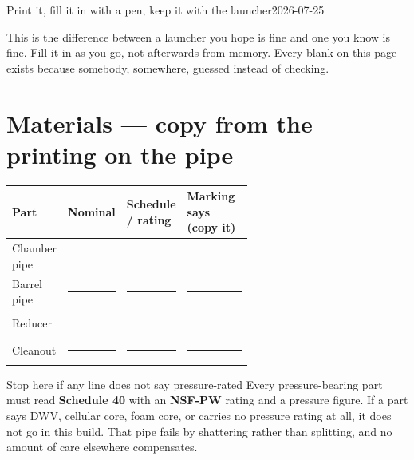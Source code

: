 


  {Print it, fill it in with a pen, keep it with the launcher}{2026-07-25}



This is the difference between a launcher you hope is fine and one you know is
fine. Fill it in as you go, not afterwards from memory. Every blank on this page
exists because somebody, somewhere, guessed instead of checking.

\begin{telosfacts}[0.22]
\end{telosfacts}

\section{Materials --- copy from the printing on the pipe}
\begin{tabularx}{\linewidth}{@{}p{0.20\linewidth}p{0.16\linewidth}p{0.24\linewidth}L@{}}
\toprule
\textbf{Part} & \textbf{Nominal} & \textbf{Schedule / rating} & \textbf{Marking says (copy it)}\\
\midrule
Chamber pipe & \rule{0.8\linewidth}{0.4pt} & \rule{0.8\linewidth}{0.4pt} & \rule{0.9\linewidth}{0.4pt}\\[0.6em]
Barrel pipe & \rule{0.8\linewidth}{0.4pt} & \rule{0.8\linewidth}{0.4pt} & \rule{0.9\linewidth}{0.4pt}\\[0.6em]
Reducer & \rule{0.8\linewidth}{0.4pt} & \rule{0.8\linewidth}{0.4pt} & \rule{0.9\linewidth}{0.4pt}\\[0.6em]
Cleanout & \rule{0.8\linewidth}{0.4pt} & \rule{0.8\linewidth}{0.4pt} & \rule{0.9\linewidth}{0.4pt}\\
\bottomrule
\end{tabularx}

\begin{gate}{Stop here if any line does not say pressure-rated}
Every pressure-bearing part must read \textbf{Schedule 40} with an
\textbf{NSF-PW} rating and a pressure figure. If a part says DWV, cellular core,
foam core, or carries no pressure rating at all, it does not go in this build.
That pipe fails by shattering rather than splitting, and no amount of care
elsewhere compensates.
\end{gate}

